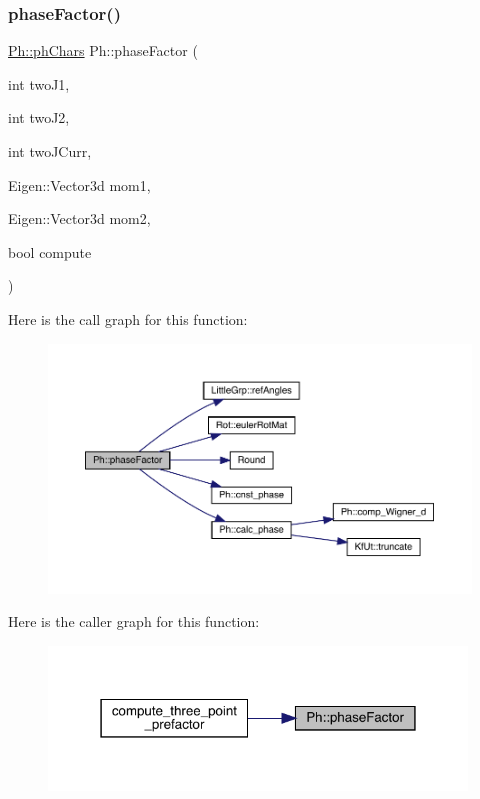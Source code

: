 \subsubsection{\texorpdfstring{phaseFactor()}{phaseFactor()}}
{\footnotesize\ttfamily \mbox{\hyperlink{structPh_1_1phChars}{Ph\+::ph\+Chars}} Ph\+::phase\+Factor (\begin{DoxyParamCaption}\item[{int}]{two\+J1,  }\item[{int}]{two\+J2,  }\item[{int}]{two\+J\+Curr,  }\item[{Eigen\+::\+Vector3d}]{mom1,  }\item[{Eigen\+::\+Vector3d}]{mom2,  }\item[{bool}]{compute }\end{DoxyParamCaption})}

Here is the call graph for this function\+:\nopagebreak
\begin{figure}[H]
\begin{center}
\leavevmode
\includegraphics[width=350pt]{d6/d3c/namespacePh_ad2fd8f885053b0833441c8388a9218b8_cgraph}
\end{center}
\end{figure}
Here is the caller graph for this function\+:\nopagebreak
\begin{figure}[H]
\begin{center}
\leavevmode
\includegraphics[width=315pt]{d6/d3c/namespacePh_ad2fd8f885053b0833441c8388a9218b8_icgraph}
\end{center}
\end{figure}
